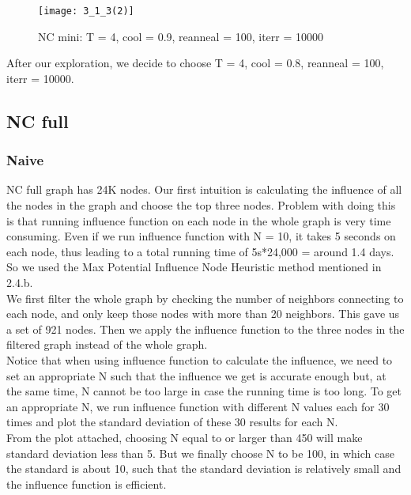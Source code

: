 \documentclass{article}
\begin{document}
\begin{figure}[h]
\begin{center}
\texttt{[image: 3\_1\_3(2)]} %
\caption{NC mini: T = 4, cool = 0.9, reanneal = 100, iterr = 10000}
\end{center}
\end{figure}

\FloatBarrier
After our exploration, we decide to choose T = 4, cool = 0.8, reanneal = 100, iterr = 10000.



\FloatBarrier
\subsection{NC full}%

\subsubsection{Naive}   %
NC full graph has 24K nodes. Our first intuition is calculating the influence of all the nodes in the graph and choose the top three nodes. Problem with doing this is that running influence function on each node in the whole graph is very time consuming. Even if we run influence function with N = 10, it takes 5 seconds on each node, thus leading to a total running time of 5s*24,000 = around 1.4 days. So we used the Max Potential Influence Node Heuristic method mentioned in 2.4.b. \\

We first filter the whole graph by checking the number of neighbors connecting to each node, and only keep those nodes with more than 20 neighbors. This gave us a set of 921 nodes. Then we apply the influence function to the three nodes in the filtered graph instead of the whole graph.\\

Notice that when using influence function to calculate the influence, we need to set an appropriate N such that the influence we get is accurate enough but, at the same time, N cannot be too large in case the running time is too long. To get an appropriate N, we run influence function with different N values each for 30 times and plot the standard deviation of these 30 results for each N. \\

From the plot attached, choosing N equal to or larger than 450 will make standard deviation less than 5. But we finally choose N to be 100, in which case the standard is about 10, such that the standard deviation is relatively small and the influence function is efficient. \\
\end{document}
